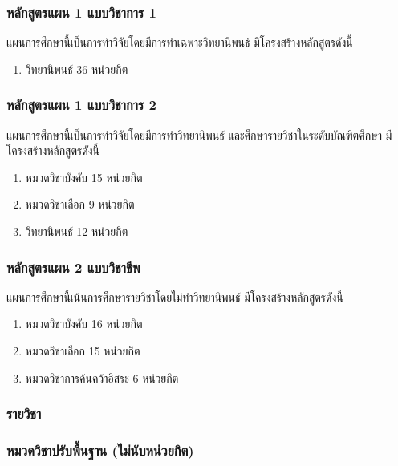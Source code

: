 \subsubsection*{หลักสูตรแผน 1 แบบวิชาการ 1} 
แผนการศึกษานี้เป็นการทำวิจัยโดยมีการทำเฉพาะวิทยานิพนธ์ มีโครงสร้างหลักสูตรดังนี้

\begin{enumerate}
	\item วิทยานิพนธ์ \hfill 36 หน่วยกิต
\end{enumerate}

\subsubsection*{หลักสูตรแผน 1 แบบวิชาการ 2} 
แผนการศึกษานี้เป็นการทำวิจัยโดยมีการทำวิทยานิพนธ์ และศึกษารายวิชาในระดับบัณฑิตศึกษา มีโครงสร้างหลักสูตรดังนี้

\begin{enumerate}
	\item หมวดวิชาบังคับ \hfill 15 หน่วยกิต
	\item หมวดวิชาเลือก \hfill 9 หน่วยกิต
	\item วิทยานิพนธ์ \hfill 12 หน่วยกิต
\end{enumerate}


\subsubsection*{หลักสูตรแผน 2 แบบวิชาชีพ} 
แผนการศึกษานี้เน้นการศึกษารายวิชาโดยไม่ทำวิทยานิพนธ์ มีโครงสร้างหลักสูตรดังนี้

\begin{enumerate}
	\item หมวดวิชาบังคับ \hfill 16 หน่วยกิต
	\item หมวดวิชาเลือก \hfill 15 หน่วยกิต
	\item หมวดวิชาการค้นคว้าอิสระ \hfill 6 หน่วยกิต
\end{enumerate}

\clearpage
\subsubsection{รายวิชา}

\subsubsection*{หมวดวิชาปรับพื้นฐาน (ไม่นับหน่วยกิต)}




